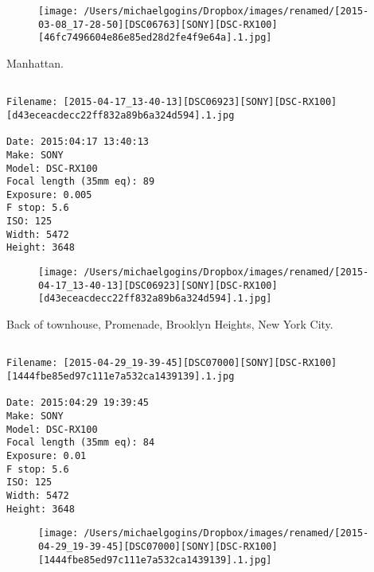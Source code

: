 \begin{figure}
\texttt{[image: /Users/michaelgogins/Dropbox/images/renamed/[2015-03-08\_17-28-50][DSC06763][SONY][DSC-RX100][46fc7496604e86e85ed28d2fe4f9e64a].1.jpg]}
\end{figure}
    
\clearpage
\onecolumn
\noindent Manhattan.
\noindent
\begin{lstlisting}

Filename: [2015-04-17_13-40-13][DSC06923][SONY][DSC-RX100][d43eceacdecc22ff832a89b6a324d594].1.jpg

Date: 2015:04:17 13:40:13
Make: SONY
Model: DSC-RX100
Focal length (35mm eq): 89
Exposure: 0.005
F stop: 5.6
ISO: 125
Width: 5472
Height: 3648
\end{lstlisting}
\clearpage

\begin{figure}
\texttt{[image: /Users/michaelgogins/Dropbox/images/renamed/[2015-04-17\_13-40-13][DSC06923][SONY][DSC-RX100][d43eceacdecc22ff832a89b6a324d594].1.jpg]}
\end{figure}
    
\clearpage
\onecolumn
\noindent Back of townhouse, Promenade, Brooklyn Heights, New York City.
\noindent
\begin{lstlisting}

Filename: [2015-04-29_19-39-45][DSC07000][SONY][DSC-RX100][1444fbe85ed97c111e7a532ca1439139].1.jpg

Date: 2015:04:29 19:39:45
Make: SONY
Model: DSC-RX100
Focal length (35mm eq): 84
Exposure: 0.01
F stop: 5.6
ISO: 125
Width: 5472
Height: 3648
\end{lstlisting}
\clearpage

\begin{figure}
\texttt{[image: /Users/michaelgogins/Dropbox/images/renamed/[2015-04-29\_19-39-45][DSC07000][SONY][DSC-RX100][1444fbe85ed97c111e7a532ca1439139].1.jpg]}
\end{figure}
    
